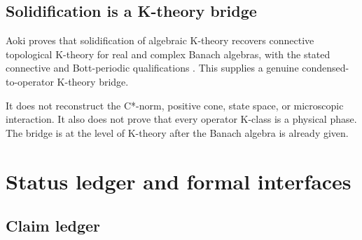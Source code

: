 \documentclass[12pt]{article}
\theoremstyle{definition}
\theoremstyle{remark}
\begin{document}
\subsection{Solidification is a K-theory bridge}

Aoki proves that solidification of algebraic K-theory recovers connective
topological K-theory for real and complex Banach algebras, with the stated
connective and Bott-periodic qualifications \cite{Aoki2024}.
This supplies a genuine condensed-to-operator K-theory bridge.

It does not reconstruct the C*-norm, positive cone, state space, or
microscopic interaction.
It also does not prove that every operator K-class is a physical phase.
The bridge is at the level of K-theory after the Banach algebra is already
given.

\section{Status ledger and formal interfaces}

\subsection{Claim ledger}
\end{document}
